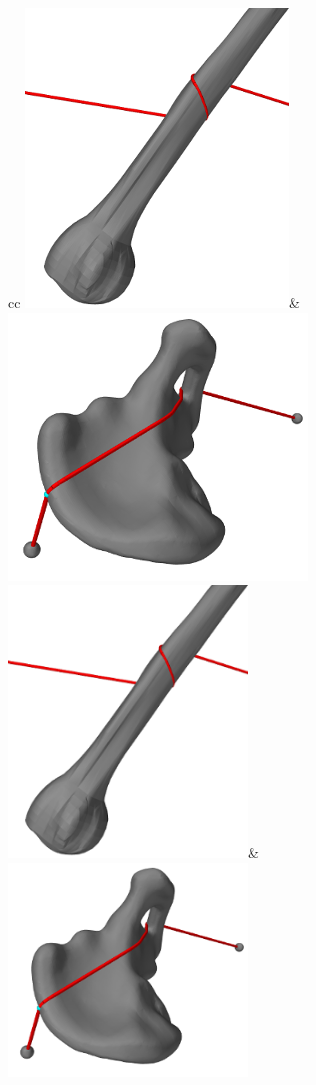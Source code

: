 \begin{figure}[ht]
\begin{center}
\begin{tabular}{cc}
\iflatexml
 \includegraphics[]{images/HumerusWrap}&
 \includegraphics[]{images/HipWrap}
\else
 \includegraphics[width=2.5in]{images/HumerusWrap}&
 \includegraphics[width=2.5in]{images/HipWrap}

\end{tabular}
\end{center}
\end{figure}

